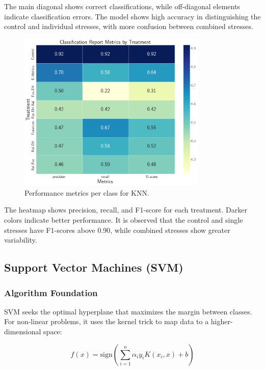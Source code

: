 \documentclass[12pt,a4paper]{article}
\begin{document}
The main diagonal shows correct classifications, while off-diagonal elements indicate classification errors. The model shows high accuracy in distinguishing the control and individual stresses, with more confusion between combined stresses.

\begin{figure}[H]
    \centering
    \includegraphics[width=0.8\textwidth]{Plots/KNN_Metrics_Report.png}
    \caption{Performance metrics per class for KNN. }
    \label{fig:knn_report}
\end{figure}

The heatmap shows precision, recall, and F1-score for each treatment. Darker colors indicate better performance. It is observed that the control and single stresses have F1-scores above 0.90, while combined stresses show greater variability.

\subsection{Support Vector Machines (SVM)}

\subsubsection{Algorithm Foundation}

SVM seeks the optimal hyperplane that maximizes the margin between classes. For non-linear problems, it uses the kernel trick to map data to a higher-dimensional space:

\begin{equation}
f(x) = \text{sign}\left(\sum_{i=1}^{n} \alpha_i y_i K(x_i, x) + b\right)
\end{equation}
\end{document}
